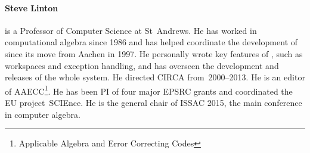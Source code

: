 \paragraph{Steve Linton}

%

%



is a Professor of Computer Science
at St~Andrews. He has worked in computational algebra since 1986 
and has helped coordinate the development of \GAP\ %
since its move from Aachen in 1997. He personally wrote key
features of \GAP, such as workspaces and exception handling,
and has overseen the development and releases of the whole system.
He directed CIRCA from~2000--2013. He is an editor of 
AAECC\footnote{Applicable Algebra and Error Correcting Codes}. 
He has been PI of four major EPSRC grants and coordinated the EU 
project~SCIEnce. He is the general chair of ISSAC 2015, the main 
conference in computer algebra.
